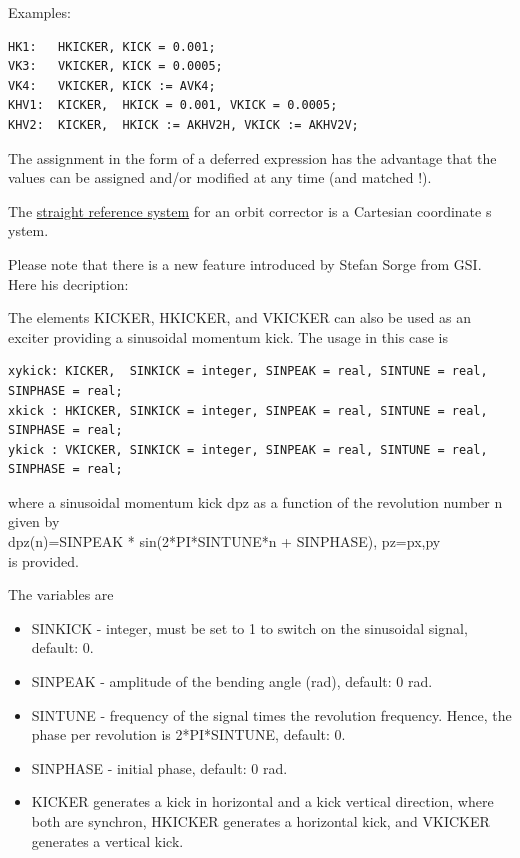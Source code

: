  Examples: 
\begin{verbatim}
HK1:   HKICKER, KICK = 0.001;
VK3:   VKICKER, KICK = 0.0005;
VK4:   VKICKER, KICK := AVK4;
KHV1:  KICKER,  HKICK = 0.001, VKICK = 0.0005;
KHV2:  KICKER,  HKICK := AKHV2H, VKICK := AKHV2V;
\end{verbatim} 

The assignment in the form of a deferred expression has the advantage
that the values can be assigned and/or modified at any time (and matched
!).  

The \href{local_system.html#straight}{straight reference system} for an
orbit corrector is a Cartesian coordinate s ystem.  

Please note that there is a new feature introduced by Stefan Sorge from
GSI. Here his decription:

The elements KICKER, HKICKER, and VKICKER can also be used as  an
exciter providing a sinusoidal momentum kick. The usage in this case is   

\begin{verbatim}
xykick: KICKER,  SINKICK = integer, SINPEAK = real, SINTUNE = real, SINPHASE = real;  
xkick : HKICKER, SINKICK = integer, SINPEAK = real, SINTUNE = real, SINPHASE = real;  
ykick : VKICKER, SINKICK = integer, SINPEAK = real, SINTUNE = real, SINPHASE = real;  
\end{verbatim}
where a sinusoidal momentum kick dpz as a function of the  revolution
number n given by\\   
dpz(n)=SINPEAK * sin(2*PI*SINTUNE*n + SINPHASE), pz=px,py \\ 
is provided. 

The variables are 

\begin{itemize}
   \item SINKICK - integer, must be set to 1 to switch on the sinusoidal
     signal, default: 0.  
   \item SINPEAK - amplitude of the bending angle (rad), default: 0 rad.  
   \item SINTUNE - frequency of the signal times the revolution
     frequency.  Hence, the phase per revolution is 2*PI*SINTUNE,
     default: 0.   
   \item SINPHASE - initial phase, default: 0 rad.  
   \item KICKER generates a kick in horizontal and a kick vertical
     direction,  where both are synchron, HKICKER generates a horizontal
     kick,  and VKICKER generates a vertical kick.   
\end{itemize}

